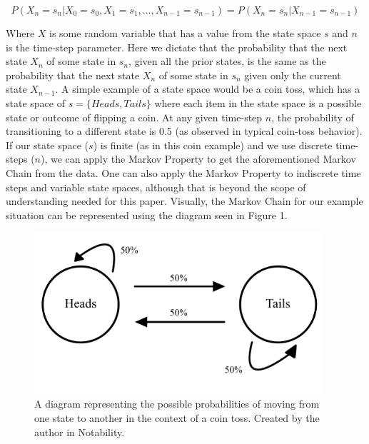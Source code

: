 \documentclass[12pt,final]{article}
\begin{document}
\begin{equation}
  P(X_n=s_n|X_0=s_0,X_1=s_1,\dots,X_{n-1}=s_{n-1}) = P(X_n=s_n | X_{n-1}=s_{n-1})
  \label{eq:markovproperty}
\end{equation}

Where $X$ is some random variable that has a value from the state space $s$ and $n$ is the
time-step parameter. Here we dictate that the probability that the next state $X_n$ of some state
in $s_n$, given all the prior states, is the same as the probability that the next state $X_n$ of
some state in $s_n$ given only the current state $X_{n-1}$. A simple example of a state space
would be a coin toss, which has a state space of $s=\{Heads, Tails\}$ where each item in the
state space is a possible state or outcome of flipping a coin. At any given time-step $n$, the
probability of transitioning to a different state is 0.5 (as observed in typical coin-toss
behavior). If our state space ($s$) is finite (as in this coin example) and we use discrete
time-steps ($n$), we can apply the Markov Property to get the aforementioned Markov Chain from
the data. One can also apply the Markov Property to indiscrete time steps and variable state
spaces, although that is beyond the scope of understanding needed for this paper. Visually, the
Markov Chain for our example situation can be represented using the diagram seen in
Figure 1.

\begin{figure}[H]
  \begin{center}
    \includegraphics[width=0.95\textwidth]{figures/Figure-1}
  \end{center}
  \caption{A diagram representing the possible probabilities of moving from one state to another in the context of a coin toss. Created by the author in Notability.}
  \label{fig:markovchainexamplecointoss}
\end{figure}
\end{document}
